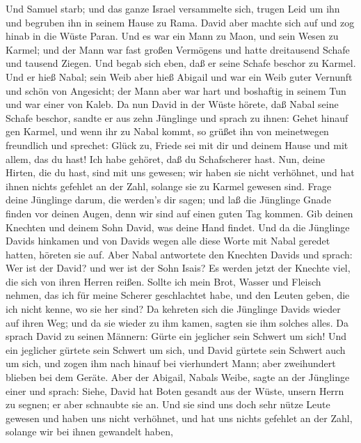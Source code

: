  Und Samuel starb; und das ganze Israel versammelte sich,
trugen Leid um ihn und begruben ihn in seinem Hause zu Rama. David aber
machte sich auf und zog hinab in die Wüste Paran.  Und es
war ein Mann zu Maon, und sein Wesen zu Karmel; und der Mann war fast
großen Vermögens und hatte dreitausend Schafe und tausend Ziegen. Und
begab sich eben, daß er seine Schafe beschor zu Karmel.  Und
er hieß Nabal; sein Weib aber hieß Abigail und war ein Weib guter
Vernunft und schön von Angesicht; der Mann aber war hart und boshaftig
in seinem Tun und war einer von Kaleb.  Da nun David in der
Wüste hörete, daß Nabal seine Schafe beschor,  sandte er aus
zehn Jünglinge und sprach zu ihnen: Gehet hinauf gen Karmel, und wenn
ihr zu Nabal kommt, so grüßet ihn von meinetwegen freundlich
 und sprechet: Glück zu, Friede sei mit dir und deinem Hause
und mit allem, das du hast!  Ich habe gehöret, daß du
Schafscherer hast. Nun, deine Hirten, die du hast, sind mit uns gewesen;
wir haben sie nicht verhöhnet, und hat ihnen nichts gefehlet an der
Zahl, solange sie zu Karmel gewesen sind.  Frage deine
Jünglinge darum, die werden's dir sagen; und laß die Jünglinge Gnade
finden vor deinen Augen, denn wir sind auf einen guten Tag kommen. Gib
deinen Knechten und deinem Sohn David, was deine Hand findet.
 Und da die Jünglinge Davids hinkamen und von Davids wegen
alle diese Worte mit Nabal geredet hatten, höreten sie auf.
 Aber Nabal antwortete den Knechten Davids und sprach: Wer
ist der David? und wer ist der Sohn Isais? Es werden jetzt der Knechte
viel, die sich von ihren Herren reißen.  Sollte ich mein
Brot, Wasser und Fleisch nehmen, das ich für meine Scherer geschlachtet
habe, und den Leuten geben, die ich nicht kenne, wo sie her sind?
 Da kehreten sich die Jünglinge Davids wieder auf ihren
Weg; und da sie wieder zu ihm kamen, sagten sie ihm solches alles.
 Da sprach David zu seinen Männern: Gürte ein jeglicher
sein Schwert um sich! Und ein jeglicher gürtete sein Schwert um sich,
und David gürtete sein Schwert auch um sich, und zogen ihm nach hinauf
bei vierhundert Mann; aber zweihundert blieben bei dem Geräte.
 Aber der Abigail, Nabals Weibe, sagte an der Jünglinge
einer und sprach: Siehe, David hat Boten gesandt aus der Wüste, unsern
Herrn zu segnen; er aber schnaubte sie an.  Und sie sind
uns doch sehr nütze Leute gewesen und haben uns nicht verhöhnet, und hat
uns nichts gefehlet an der Zahl, solange wir bei ihnen gewandelt haben,
